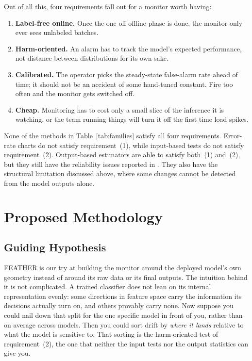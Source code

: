 \documentclass[graybox]{SNmult}
\begin{document}
Out of all this, four requirements fall out for a monitor worth having:

\begin{enumerate}
\item{\textbf{Label-free online.} Once the one-off offline phase is done,
  the monitor only ever sees unlabeled batches.}
\item{\textbf{Harm-oriented.} An alarm has to track the model's expected
  performance, not distance between distributions for its own sake.}
\item{\textbf{Calibrated.} The operator picks the steady-state
  false-alarm rate ahead of time; it should not be an accident of some
  hand-tuned constant. Fire too often and the monitor gets switched off.}
\item{\textbf{Cheap.} Monitoring has to cost only a small slice of the
  inference it is watching, or the team running things will turn it off
  the first time load spikes.}
\end{enumerate}

None of the methods in Table~\ref{tab:families} satisfy all four requirements. Error-rate charts do not satisfy requirement~(1),  while input-based tests do not satisfy requirement~(2). Output-based estimators are able to satisfy both~(1) and~(2), but they still have the reliability issues reported in \cite{guo2017calibration, ovadia2019trust}. They also have the structural limitation discussed above, where some changes cannot be detected from the model outputs alone.


\section{Proposed Methodology}
\label{sec:project}

\subsection{Guiding Hypothesis}

FEATHER is our try at building the monitor around the deployed model's
own geometry instead of around its raw data or its final outputs. The
intuition behind it is not complicated. A trained classifier does not
lean on its internal representation evenly: some directions in feature
space carry the information its decisions actually turn on, and others
provably carry none. Now suppose you could nail down that split for the
one specific model in front of you, rather than on average across
models. Then you could sort drift by \emph{where it lands} relative to
what the model is sensitive to. That sorting is the harm-oriented test
of requirement~(2), the one that neither the input tests nor the output
statistics can give you.
\end{document}
